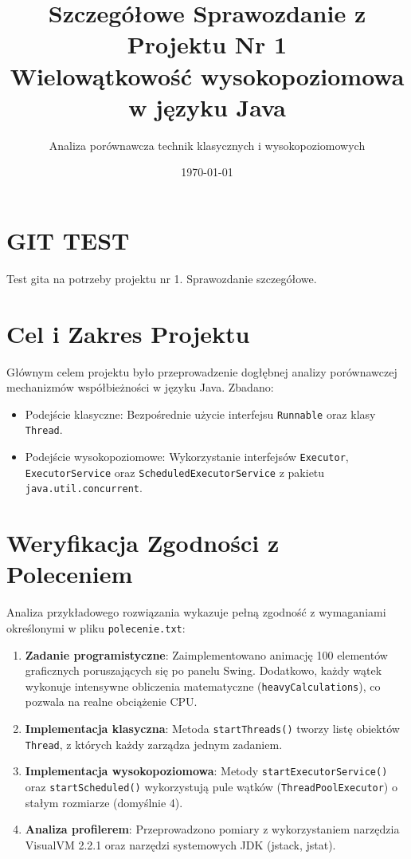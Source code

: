 \documentclass[11pt,a4paper]{article}
\title{\textbf{Szczegółowe Sprawozdanie z Projektu Nr 1} \\ \Large Wielowątkowość wysokopoziomowa w języku Java}
\author{Analiza porównawcza technik klasycznych i wysokopoziomowych}
\date{\today}
\begin{document}
\maketitle

\tableofcontents
\newpage

\section{GIT TEST}
Test gita na potrzeby projektu nr 1. Sprawozdanie szczegółowe.

\section{Cel i Zakres Projektu}
Głównym celem projektu było przeprowadzenie dogłębnej analizy porównawczej mechanizmów współbieżności w języku Java. Zbadano:
\begin{itemize}
    \item Podejście klasyczne: Bezpośrednie użycie interfejsu \texttt{Runnable} oraz klasy \texttt{Thread}.
    \item Podejście wysokopoziomowe: Wykorzystanie interfejsów \texttt{Executor}, \texttt{ExecutorService} oraz \texttt{ScheduledExecutorService} z pakietu \texttt{java.util.concurrent}.
\end{itemize}

\section{Weryfikacja Zgodności z Poleceniem}
Analiza przykładowego rozwiązania wykazuje pełną zgodność z wymaganiami określonymi w pliku \texttt{polecenie.txt}:
\begin{enumerate}
    \item \textbf{Zadanie programistyczne}: Zaimplementowano animację 100 elementów graficznych poruszających się po panelu Swing. Dodatkowo, każdy wątek wykonuje intensywne obliczenia matematyczne (\texttt{heavyCalculations}), co pozwala na realne obciążenie CPU.
    \item \textbf{Implementacja klasyczna}: Metoda \texttt{startThreads()} tworzy listę obiektów \texttt{Thread}, z których każdy zarządza jednym zadaniem.
    \item \textbf{Implementacja wysokopoziomowa}: Metody \texttt{startExecutorService()} oraz \texttt{startScheduled()} wykorzystują pule wątków (\texttt{ThreadPoolExecutor}) o stałym rozmiarze (domyślnie 4).
    \item \textbf{Analiza profilerem}: Przeprowadzono pomiary z wykorzystaniem narzędzia VisualVM 2.2.1 oraz narzędzi systemowych JDK (jstack, jstat).
\end{enumerate}
\end{document}
